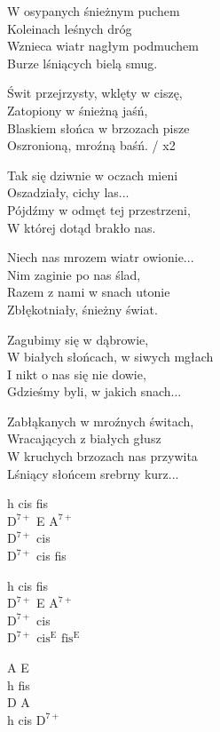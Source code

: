 \begin{text}
    W osypanych śnieżnym puchem\\
    Koleinach leśnych dróg\\
    Wznieca wiatr nagłym podmuchem\\
    Burze lśniących bielą smug.

    Świt przejrzysty, wklęty w ciszę,\\
    Zatopiony w śnieżną jaśń,\\
    Blaskiem słońca w brzozach pisze\\
    Oszronioną, mroźną baśń. / x2

    Tak się dziwnie w oczach mieni\\
    Oszadziały, cichy las...\\
    Pójdźmy w odmęt tej przestrzeni,\\
    W której dotąd brakło nas.

    Niech nas mrozem wiatr owionie...\\
    Nim zaginie po nas ślad,\\
    Razem z nami w snach utonie\\
    Zbłękotniały, śnieżny świat.

    Zagubimy się w dąbrowie,\\
    W białych słońcach, w siwych mgłach\\
    I nikt o nas się nie dowie,\\
    Gdzieśmy byli, w jakich snach...

    Zabłąkanych w mroźnych świtach,\\
    Wracających z białych głusz\\
    W kruchych brzozach nas przywita\\
    Lśniący słońcem srebrny kurz...
\end{text}
\begin{chord}
    h cis fis\\
    $\mathrm{D^{7+}}$ E $\mathrm{A^{7+}}$\\
    $\mathrm{D^{7+}}$ cis\\
    $\mathrm{D^{7+}}$ cis fis

    h cis fis\\
    $\mathrm{D^{7+}}$ E $\mathrm{A^{7+}}$\\
    $\mathrm{D^{7+}}$ cis\\
    $\mathrm{D^{7+}}$ $\mathrm{cis^{E}}$ $\mathrm{fis^{E}}$

    A E\\
    h fis\\
    D A\\
    h cis $\mathrm{D^{7+}}$
\end{chord}
